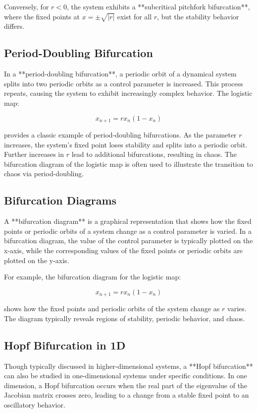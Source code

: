 \documentclass{amsbook}
\begin{document}
Conversely, for \( r < 0 \), the system exhibits a **subcritical pitchfork bifurcation**, where the fixed points at \( x = \pm \sqrt{|r|} \) exist for all \( r \), but the stability behavior differs.

\subsection{Period-Doubling Bifurcation}

In a **period-doubling bifurcation**, a periodic orbit of a dynamical system splits into two periodic orbits as a control parameter is increased. This process repeats, causing the system to exhibit increasingly complex behavior. The logistic map:

\[
x_{n+1} = r x_n (1 - x_n)
\]

provides a classic example of period-doubling bifurcations. As the parameter \( r \) increases, the system's fixed point loses stability and splits into a periodic orbit. Further increases in \( r \) lead to additional bifurcations, resulting in chaos. The bifurcation diagram of the logistic map is often used to illustrate the transition to chaos via period-doubling.

\subsection{Bifurcation Diagrams}

A **bifurcation diagram** is a graphical representation that shows how the fixed points or periodic orbits of a system change as a control parameter is varied. In a bifurcation diagram, the value of the control parameter is typically plotted on the x-axis, while the corresponding values of the fixed points or periodic orbits are plotted on the y-axis.

For example, the bifurcation diagram for the logistic map:

\[
x_{n+1} = r x_n (1 - x_n)
\]

shows how the fixed points and periodic orbits of the system change as \( r \) varies. The diagram typically reveals regions of stability, periodic behavior, and chaos.

\subsection{Hopf Bifurcation in 1D}

Though typically discussed in higher-dimensional systems, a **Hopf bifurcation** can also be studied in one-dimensional systems under specific conditions. In one dimension, a Hopf bifurcation occurs when the real part of the eigenvalue of the Jacobian matrix crosses zero, leading to a change from a stable fixed point to an oscillatory behavior.
\end{document}
